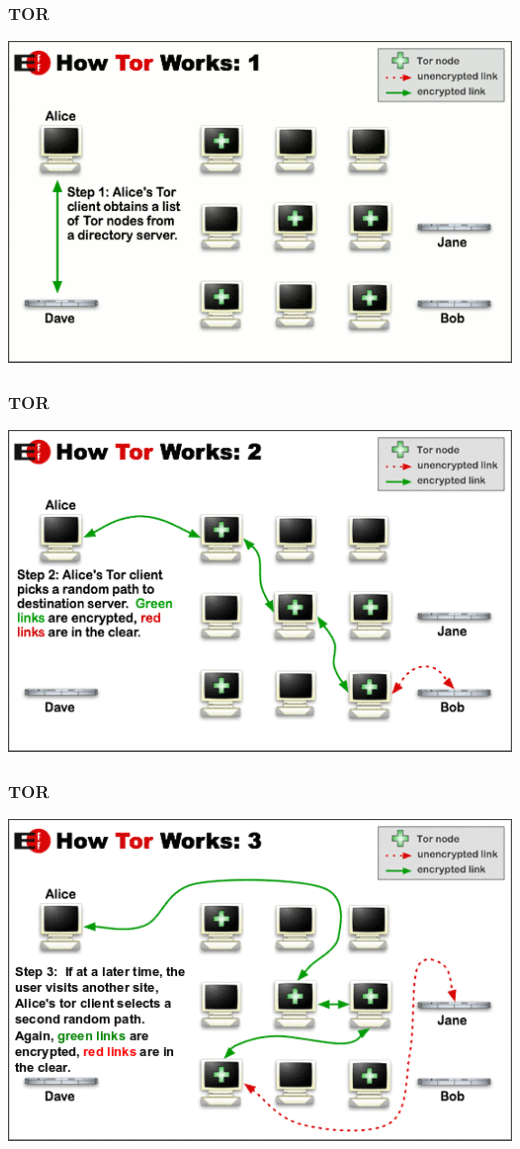 \documentclass[12pt]{beamer}
\begin{document}
\begin{frame}
    \frametitle{TOR}
    \includegraphics[height=0.7\textheight]{img/tor1.png}
\end{frame}

\begin{frame}
    \frametitle{TOR}
    \includegraphics[height=0.7\textheight]{img/tor2.png}
\end{frame}

\begin{frame}
    \frametitle{TOR}
    \includegraphics[height=0.7\textheight]{img/tor3.png}
\end{frame}
\end{document}
